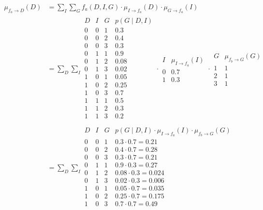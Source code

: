 \documentclass[a4paper, 12pt]{article}
\begin{document}
\begin{align}
	\mu_{f_a \to D}(D) &= \sum_I \sum_G f_a(D, I, G) \cdot \mu_{I \to f_a}(D) \cdot \mu_{G \to f_a}(I)\\
	&= \sum_D \sum_I \begin{array}{ccc|c}
		D & I & G & p(G \mid D, I)\\
		\hline
		0 & 0 & 1 & 0.3\\
		0 & 0 & 2 & 0.4\\
		0 & 0 & 3 & 0.3\\
		0 & 1 & 1 & 0.9\\
		0 & 1 & 2 & 0.08\\
		0 & 1 & 3 & 0.02\\
		1 & 0 & 1 & 0.05\\
		1 & 0 & 2 & 0.25\\
		1 & 0 & 3 & 0.7\\
		1 & 1 & 1 & 0.5\\
		1 & 1 & 2 & 0.3\\
		1 & 1 & 3 & 0.2\\
	\end{array} \cdot \begin{array}{c|c}
		I & \mu_{I \to f_a}(I)\\
		\hline
		0 & 0.7\\
		1 & 0.3
	\end{array} \cdot \begin{array}{c|c}
		G & \mu_{f_b \to G}(G)\\
		\hline
		1 & 1\\
		2 & 1\\
		3 & 1
	\end{array}\\
	&= \sum_D \sum_I \begin{array}{ccc|c}
		D & I & G & p(G \mid D, I) \cdot \mu_{I \to f_a}(I) \cdot \mu_{f_b \to G}(G) \\
		\hline
		0 & 0 & 1 & 0.3 \cdot 0.7 = 0.21\\
		0 & 0 & 2 & 0.4 \cdot 0.7 = 0.28\\
		0 & 0 & 3 & 0.3 \cdot 0.7 = 0.21\\
		0 & 1 & 1 & 0.9 \cdot 0.3 = 0.27\\
		0 & 1 & 2 & 0.08 \cdot 0.3 = 0.024\\
		0 & 1 & 3 & 0.02 \cdot 0.3 = 0.006\\
		1 & 0 & 1 & 0.05 \cdot 0.7 = 0.035\\
		1 & 0 & 2 & 0.25 \cdot 0.7 = 0.175\\
		1 & 0 & 3 & 0.7 \cdot 0.7 = 0.49\\

\end{array}
\end{align}
\end{document}
